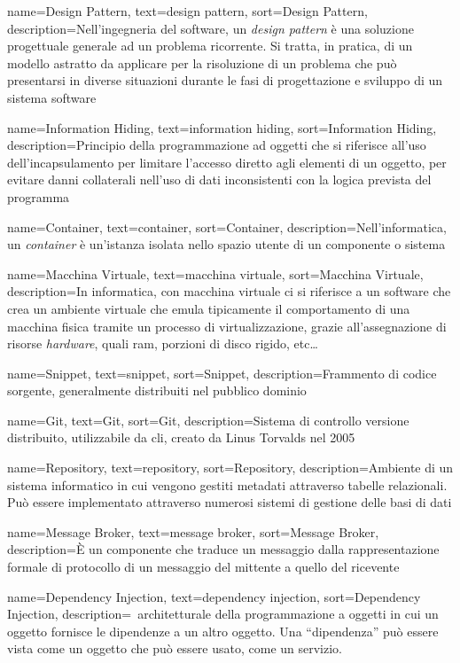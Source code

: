{
    name=Design Pattern,
    text=design pattern,
    sort=Design Pattern,
    description={Nell'ingegneria del software, un \emph{design pattern} è una soluzione progettuale generale ad un problema ricorrente. Si tratta, in pratica, di un modello astratto da applicare per la risoluzione di un problema che può presentarsi in diverse situazioni durante le fasi di progettazione e sviluppo di un sistema software}
}

{
    name=Information Hiding,
    text=information hiding,
    sort=Information Hiding,
    description={Principio della programmazione ad oggetti che si riferisce all'uso dell'incapsulamento per limitare l'accesso diretto agli elementi di un oggetto, per evitare danni collaterali nell'uso di dati inconsistenti con la logica prevista del programma}
}

{
    name=Container,
    text=container,
    sort=Container,
    description={Nell'informatica, un \emph{container} è un'istanza isolata nello spazio utente di un componente o sistema}
}

{
    name=Macchina Virtuale,
    text=macchina virtuale,
    sort=Macchina Virtuale,
    description={In informatica, con macchina virtuale ci si riferisce a un software che crea un ambiente virtuale che emula tipicamente il comportamento di una macchina fisica tramite un processo di virtualizzazione, grazie all'assegnazione di risorse \emph{hardware}, quali \gls{ram}, porzioni di disco rigido, etc\dots }
}

{
    name=Snippet,
    text=snippet,
    sort=Snippet,
    description={Frammento di codice sorgente, generalmente distribuiti nel pubblico dominio}
}

{
    name=Git,
    text=Git,
    sort=Git,
    description={Sistema di controllo versione distribuito, utilizzabile da \gls{cli}, creato da Linus Torvalds nel 2005}
}

{
    name=Repository,
    text=repository,
    sort=Repository,
    description={Ambiente di un sistema informatico in cui vengono gestiti metadati attraverso tabelle relazionali. Può essere implementato attraverso numerosi sistemi di gestione delle basi di dati}
}

{
    name=Message Broker,
    text=message broker,
    sort=Message Broker,
    description={È un componente che traduce un messaggio dalla rappresentazione formale di protocollo di un messaggio del mittente a quello del ricevente}
}

{
    name=Dependency Injection,
    text=dependency injection,
    sort=Dependency Injection,
    description={\gloss\ architetturale della programmazione a oggetti in cui un oggetto fornisce le dipendenze a un altro oggetto. Una ``dipendenza'' può essere vista come un oggetto che può essere usato, come un servizio.}
}
